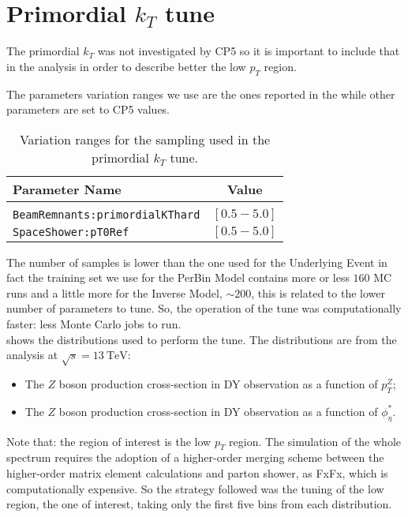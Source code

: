 \section{Primordial $k_T$ tune}

The primordial $k_T$ was not investigated by CP5 so it is important to include that in the analysis in order to describe better the low $p_T$ region. 

The parameters variation ranges we use are the ones reported in the  while other parameters are set to CP5 values.



\begin{table}[!htb]
\centering
\begin{tabular}{l | c }
Parameter Name & Value \\ 
\hline \hline
\\[-0.85em]
	\texttt{BeamRemnants:primordialKThard} & $[0.5 - 5.0]$\\[2pt]
	\texttt{SpaceShower:pT0Ref} & $[0.5 - 5.0]$\\
\end{tabular}
\caption{Variation ranges for the sampling used in the primordial $k_T$ tune.}
\label{table:primordialkT_variations}
\end{table} 

The number of samples is lower than the one used for the Underlying Event in fact the training set we use for the PerBin Model contains more or less $160$ MC runs and a little more for the Inverse Model, $\sim 200$, this is related to the lower number of parameters to tune. So, the operation of the tune was computationally faster: less Monte Carlo jobs to run.
\\
 shows the distributions used to perform the tune. The distributions  are from the \cite{ZpT_distributions} analysis at $\sqrt{s}=13\ \mathrm{TeV}$:
\begin{itemize}
	\item The $Z$ boson production cross-section in DY observation as a function of $p_T^Z$;
	\item The $Z$ boson production cross-section in DY observation as a function of $\phi_\eta^*$.
\end{itemize}

\noindent Note that: the region of interest is the low $p_T$ region. The simulation of the whole spectrum requires the adoption of a higher-order merging scheme between the higher-order matrix element calculations and parton shower, as FxFx, which is computationally expensive. So the strategy followed was the tuning of the low region, the one of interest, taking only the first five bins from each distribution.  


